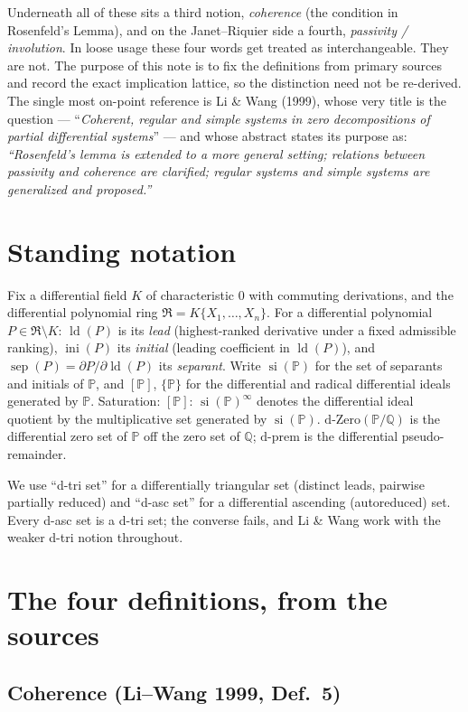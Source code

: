 \documentclass[11pt]{article}
\newcommand{\sat}[2]{[#1]\!:\!#2^{\infty}}
\newcommand{\ld}{\operatorname{ld}}
\newcommand{\sep}{\operatorname{sep}}
\newcommand{\ini}{\operatorname{ini}}
\newcommand{\si}{\operatorname{si}}
\newcommand{\dZero}{\mathrm{d\text{-}Zero}}
\newcommand{\dprem}{\mathrm{d\text{-}prem}}
\newcommand{\R}{\mathfrak{R}}
\newcommand{\PP}{\mathbb{P}}
\begin{document}
Underneath all of these sits a third notion, \emph{coherence} (the condition in
Rosenfeld's Lemma), and on the Janet--Riquier side a fourth, \emph{passivity /
involution}. In loose usage these four words get treated as interchangeable.
They are not. The purpose of this note is to fix the definitions from primary
sources and record the exact implication lattice, so the distinction need not be
re-derived. The single most on-point reference is Li \& Wang (1999), whose very
title is the question --- ``\emph{Coherent, regular and simple systems in zero
decompositions of partial differential systems}'' --- and whose abstract states
its purpose as: \emph{``Rosenfeld's lemma is extended to a more general setting;
relations between passivity and coherence are clarified; regular systems and
simple systems are generalized and proposed.''}

\section{Standing notation}

Fix a differential field $K$ of characteristic $0$ with commuting derivations,
and the differential polynomial ring $\R=K\{X_1,\dots,X_n\}$. For a differential
polynomial $P\in\R\setminus K$: $\ld(P)$ is its \emph{lead} (highest-ranked
derivative under a fixed admissible ranking), $\ini(P)$ its \emph{initial}
(leading coefficient in $\ld(P)$), and $\sep(P)=\partial P/\partial\ld(P)$ its
\emph{separant}. Write $\si(\PP)$ for the set of separants and initials of
$\PP$, and $[\PP]$, $\{\PP\}$ for the differential and radical differential
ideals generated by $\PP$. Saturation: $\sat{\PP}{\,\si(\PP)}$ denotes the
differential ideal quotient by the multiplicative set generated by $\si(\PP)$.
$\dZero(\PP/\mathbb{Q})$ is the differential zero set of $\PP$ off the zero set
of $\mathbb{Q}$; $\dprem$ is the differential pseudo-remainder.

We use ``d-tri set'' for a differentially triangular set (distinct leads,
pairwise partially reduced) and ``d-asc set'' for a differential ascending
(autoreduced) set. Every d-asc set is a d-tri set; the converse fails, and Li \&
Wang work with the weaker d-tri notion throughout.

\section{The four definitions, from the sources}

\subsection{Coherence (Li--Wang 1999, Def.~5)}
\end{document}

